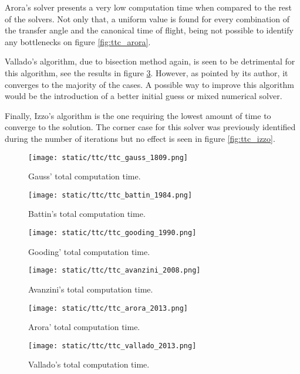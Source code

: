 Arora's solver presents a very low computation time when compared to the rest of
the solvers. Not only that, a uniform value is found for every combination of
the transfer angle and the canonical time of flight, being not possible to
identify any bottlenecks on figure \ref{fig:ttc_arora}.

Vallado's algorithm, due to bisection method again, is seen to be detrimental
for this algorithm, see the results in figure \ref{fig:ttc_vallado}. However, as
pointed by its author, it converges to the majority of the cases. A possible way
to improve this algorithm would be the introduction of a better initial guess or
mixed numerical solver.

Finally, Izzo's algorithm is the one requiring the lowest amount of time to
converge to the solution. The corner case for this solver was previously
identified during the number of iterations but no effect is seen in figure
\ref{fig:ttc_izzo}.

\begin{figure}[H]
  \begin{minipage}{0.48\textwidth}
    \centering
    \texttt{[image: static/ttc/ttc\_gauss\_1809.png]}
    \caption{Gauss' total computation time.}\label{fig:ttc_gauss}
  \end{minipage}\hfill
  \begin{minipage}{0.48\textwidth}
    \centering
    \texttt{[image: static/ttc/ttc\_battin\_1984.png]}
    \caption{Battin's total computation time.}\label{fig:ttc_battin}
  \end{minipage}
\end{figure}

\begin{figure}[H]
  \begin{minipage}{0.48\textwidth}
    \centering
    \texttt{[image: static/ttc/ttc\_gooding\_1990.png]}
    \caption{Gooding' total computation time.}\label{fig:ttc_gooding}
  \end{minipage}\hfill
  \begin{minipage}{0.48\textwidth}
    \centering
    \texttt{[image: static/ttc/ttc\_avanzini\_2008.png]}
    \caption{Avanzini's total computation time.}\label{fig:ttc_avanzini}
  \end{minipage}
\end{figure}

\begin{figure}[H]
  \begin{minipage}{0.48\textwidth}
    \centering
    \texttt{[image: static/ttc/ttc\_arora\_2013.png]}
    \caption{Arora' total computation time.}\label{fig:ttc_arora}
  \end{minipage}\hfill
  \begin{minipage}{0.48\textwidth}
    \centering
    \texttt{[image: static/ttc/ttc\_vallado\_2013.png]}
    \caption{Vallado's total computation time.}\label{fig:ttc_vallado}
  \end{minipage}
\end{figure}

